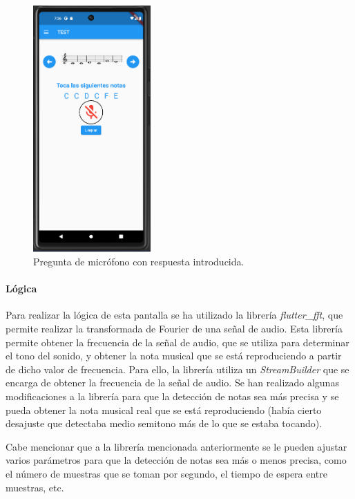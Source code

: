 \begin{figure}[H]
  \centering
  \includegraphics[width=0.4\textwidth]{imagenes/c7/entradamicrofono3.png}
  \caption{Pregunta de micrófono con respuesta introducida.}
  \label{fig:login}
\end{figure}

\paragraph*{Lógica}
Para realizar la lógica de esta pantalla se ha utilizado la librería \textit{flutter\_fft}, que permite realizar la transformada de Fourier de una señal de audio.
Esta librería permite obtener la frecuencia de la señal de audio, que se utiliza para determinar el tono del sonido, y obtener la nota musical que se está reproduciendo a partir de dicho valor de frecuencia.
Para ello, la librería utiliza un \textit{StreamBuilder} que se encarga de obtener la frecuencia de la señal de audio. 
Se han realizado algunas modificaciones a la librería para que la detección de notas sea más precisa y se pueda obtener la nota musical real que se está reproduciendo (había cierto desajuste que detectaba medio semitono más de lo que se estaba tocando).

Cabe mencionar que a la librería mencionada anteriormente se le pueden ajustar varios parámetros para que la detección de notas sea más o menos precisa, como el número de muestras que se toman por segundo, el tiempo de espera entre muestras, etc.

